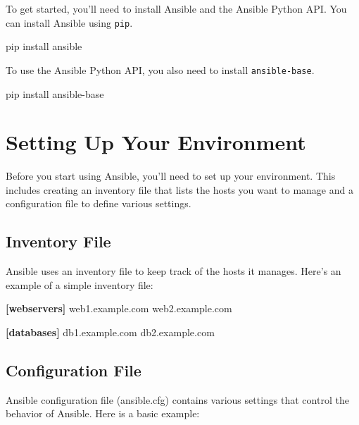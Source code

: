 \documentclass[
  letterpaper,
  DIV=11,
  numbers=noendperiod]{scrreprt}
\newenvironment{Shaded}{\begin{snugshade}}{\end{snugshade}}
\newcommand{\DataTypeTok}[1]{\textcolor[rgb]{0.68,0.00,0.00}{#1}}
\newcommand{\ExtensionTok}[1]{\textcolor[rgb]{0.00,0.23,0.31}{#1}}
\newcommand{\KeywordTok}[1]{\textcolor[rgb]{0.00,0.23,0.31}{\textbf{#1}}}
\newcommand{\NormalTok}[1]{\textcolor[rgb]{0.00,0.23,0.31}{#1}}
\begin{document}
To get started, you'll need to install Ansible and the Ansible Python
API. You can install Ansible using \texttt{pip}.

\begin{Shaded}
\begin{Highlighting}[]
\ExtensionTok{pip}\NormalTok{ install ansible}
\end{Highlighting}
\end{Shaded}

To use the Ansible Python API, you also need to install
\texttt{ansible-base}.

\begin{Shaded}
\begin{Highlighting}[]
\ExtensionTok{pip}\NormalTok{ install ansible{-}base}
\end{Highlighting}
\end{Shaded}

\section{Setting Up Your Environment}\label{setting-up-your-environment}

Before you start using Ansible, you'll need to set up your environment.
This includes creating an inventory file that lists the hosts you want
to manage and a configuration file to define various settings.

\subsection{Inventory File}\label{inventory-file}

Ansible uses an inventory file to keep track of the hosts it manages.
Here's an example of a simple inventory file:

\begin{Shaded}
\begin{Highlighting}[]
\KeywordTok{[webservers]}
\DataTypeTok{web1.example.com}
\DataTypeTok{web2.example.com}

\KeywordTok{[databases]}
\DataTypeTok{db1.example.com}
\DataTypeTok{db2.example.com}
\end{Highlighting}
\end{Shaded}

\subsection{Configuration File}\label{configuration-file}

Ansible configuration file (ansible.cfg) contains various settings that
control the behavior of Ansible. Here is a basic example:
\end{document}
